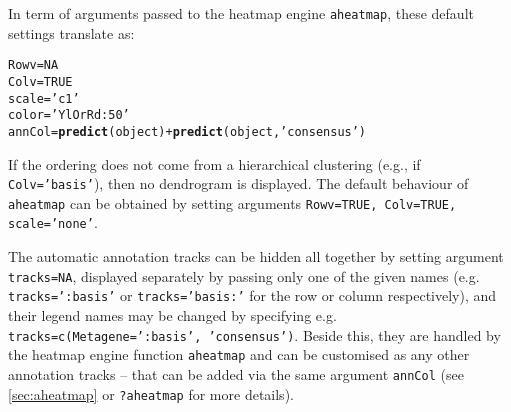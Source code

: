 \documentclass[a4paper]{article}\usepackage[]{graphicx}\usepackage[]{color}
\makeatletter
\newcommand{\hlnum}[1]{\textcolor[rgb]{0.686,0.059,0.569}{#1}}%
\newcommand{\hlstr}[1]{\textcolor[rgb]{0.192,0.494,0.8}{#1}}%
\newcommand{\hlopt}[1]{\textcolor[rgb]{0,0,0}{#1}}%
\newcommand{\hlstd}[1]{\textcolor[rgb]{0.345,0.345,0.345}{#1}}%
\newcommand{\hlkwb}[1]{\textcolor[rgb]{0.69,0.353,0.396}{#1}}%
\newcommand{\hlkwd}[1]{\textcolor[rgb]{0.737,0.353,0.396}{\textbf{#1}}}%
\newenvironment{kframe}{%
 \def\at@end@of@kframe{}%
 \ifinner\ifhmode%
  \def\at@end@of@kframe{\end{minipage}}%
  \begin{minipage}{\columnwidth}%
 \fi\fi%
 \def\FrameCommand##1{\hskip\@totalleftmargin \hskip-\fboxsep
 \colorbox{shadecolor}{##1}\hskip-\fboxsep
     \hskip-\linewidth \hskip-\@totalleftmargin \hskip\columnwidth}%
 \MakeFramed {\advance\hsize-\width
   \@totalleftmargin\z@ \linewidth\hsize
   \@setminipage}}%
 {\par\unskip\endMakeFramed%
 \at@end@of@kframe}
\newenvironment{knitrout}{}{} %
\let\code=\texttt
\makeatother
\begin{document}
In term of arguments passed to the heatmap engine \code{aheatmap}, these default 
settings translate as:

\begin{knitrout}
\color{fgcolor}\begin{kframe}
\begin{alltt}
\hlstd{Rowv} \hlkwb{=} \hlnum{NA}
\hlstd{Colv} \hlkwb{=} \hlnum{TRUE}
\hlstd{scale} \hlkwb{=} \hlstr{'c1'}
\hlstd{color} \hlkwb{=} \hlstr{'YlOrRd:50'}
\hlstd{annCol} \hlkwb{=} \hlkwd{predict}\hlstd{(object)} \hlopt{+} \hlkwd{predict}\hlstd{(object,} \hlstr{'consensus'}\hlstd{)}
\end{alltt}
\end{kframe}
\end{knitrout}

If the ordering does not come from a hierarchical clustering (e.g., if
\code{Colv='basis'}), then no dendrogram is displayed.
The default behaviour of \code{aheatmap} can be obtained by setting arguments 
\code{Rowv=TRUE, Colv=TRUE, scale='none'}.

\medskip
The automatic annotation tracks can be hidden all together by setting argument 
\code{tracks=NA}, displayed separately by passing only one of the given names 
(e.g. \code{tracks=':basis'} or \code{tracks='basis:'} for the row or column respectively),
and their legend names may be changed by
specifying e.g. \code{tracks=c(Metagene=':basis', 'consensus')}.
Beside this, they are handled by the heatmap engine function \code{aheatmap} 
and can be customised as any other annotation tracks -- that can be added via 
the same argument \code{annCol} (see \cref{sec:aheatmap} or \code{?aheatmap} for
more details).
\end{document}
